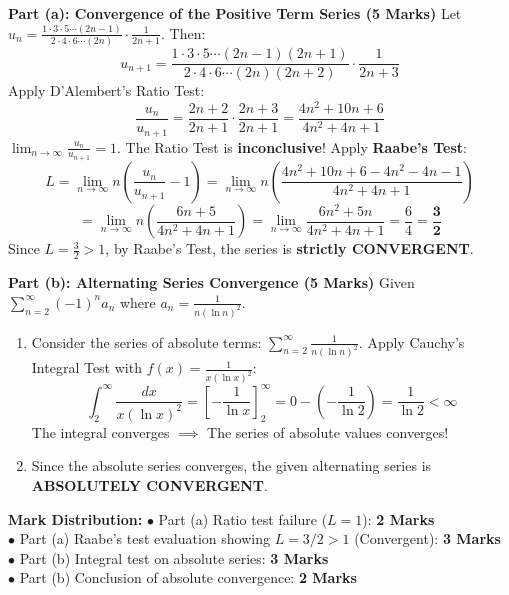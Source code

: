 \begin{solutionbox}
\textbf{Part (a): Convergence of the Positive Term Series (5 Marks)}
Let $u_n = \frac{1 \cdot 3 \cdot 5 \cdots (2n-1)}{2 \cdot 4 \cdot 6 \cdots (2n)} \cdot \frac{1}{2n+1}$.
Then:
\[
u_{n+1} = \frac{1 \cdot 3 \cdot 5 \cdots (2n-1)(2n+1)}{2 \cdot 4 \cdot 6 \cdots (2n)(2n+2)} \cdot \frac{1}{2n+3}
\]
Apply D'Alembert's Ratio Test:
\[
\frac{u_n}{u_{n+1}} = \frac{2n+2}{2n+1} \cdot \frac{2n+3}{2n+1} = \frac{4n^2 + 10n + 6}{4n^2 + 4n + 1}
\]
$\lim_{n\to\infty} \frac{u_n}{u_{n+1}} = 1$. The Ratio Test is \textbf{inconclusive}!
Apply \textbf{Raabe's Test}:
\[
L = \lim_{n\to\infty} n\left(\frac{u_n}{u_{n+1}} - 1\right) = \lim_{n\to\infty} n\left(\frac{4n^2 + 10n + 6 - 4n^2 - 4n - 1}{4n^2 + 4n + 1}\right)
\]
\[
= \lim_{n\to\infty} n\left(\frac{6n + 5}{4n^2 + 4n + 1}\right) = \lim_{n\to\infty} \frac{6n^2 + 5n}{4n^2 + 4n + 1} = \frac{6}{4} = \mathbf{\frac{3}{2}}
\]
Since $L = \frac{3}{2} > 1$, by Raabe's Test, the series is \textbf{strictly CONVERGENT}.

\textbf{Part (b): Alternating Series Convergence (5 Marks)}
Given $\sum_{n=2}^\infty (-1)^n a_n$ where $a_n = \frac{1}{n (\ln n)^2}$.
\begin{enumerate}[label=(\roman*)]
    \item Consider the series of absolute terms: $\sum_{n=2}^\infty \frac{1}{n (\ln n)^2}$.
    Apply Cauchy's Integral Test with $f(x) = \frac{1}{x (\ln x)^2}$:
    \[
    \int_2^\infty \frac{dx}{x (\ln x)^2} = \left[ -\frac{1}{\ln x} \right]_2^\infty = 0 - \left(-\frac{1}{\ln 2}\right) = \frac{1}{\ln 2} < \infty
    \]
    The integral converges $\implies$ The series of absolute values converges!
    \item Since the absolute series converges, the given alternating series is \textbf{ABSOLUTELY CONVERGENT}.
\end{enumerate}

\begin{markingrubric}
\textbf{Mark Distribution:}
$\bullet$ Part (a) Ratio test failure ($L=1$): \textbf{2 Marks}\\
$\bullet$ Part (a) Raabe's test evaluation showing $L = 3/2 > 1$ (Convergent): \textbf{3 Marks}\\
$\bullet$ Part (b) Integral test on absolute series: \textbf{3 Marks}\\
$\bullet$ Part (b) Conclusion of absolute convergence: \textbf{2 Marks}
\end{markingrubric}
\end{solutionbox}

